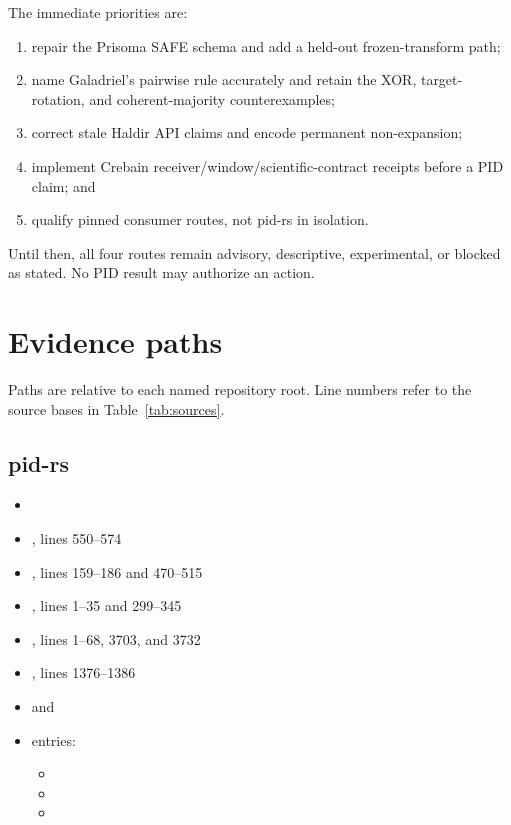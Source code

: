 \documentclass[11pt]{article}
\begin{document}
The immediate priorities are:
\begin{enumerate}
\item repair the Prisoma SAFE schema and add a held-out frozen-transform path;
\item name Galadriel's pairwise rule accurately and retain the XOR, target-rotation, and coherent-majority counterexamples;
\item correct stale Haldir API claims and encode permanent non-expansion;
\item implement Crebain receiver/window/scientific-contract receipts before a PID claim; and
\item qualify pinned consumer routes, not pid-rs in isolation.
\end{enumerate}

Until then, all four routes remain advisory, descriptive, experimental, or
blocked as stated.  No PID result may authorize an action.

\appendix
\section{Evidence paths}

Paths are relative to each named repository root.  Line numbers refer to the
source bases in Table~\ref{tab:sources}.

\subsection{pid-rs}
\begin{itemize}
\item {}
\item {}, lines 550--574
\item {}, lines 159--186 and 470--515
\item {}, lines 1--35 and 299--345
\item {}, lines 1--68, 3703, and 3732
\item {}, lines 1376--1386
\item {} and 
\item {} entries:
  \begin{itemize}
  \item {}
  \item {}
  \item {}
  \end{itemize}
\end{itemize}
\end{document}
